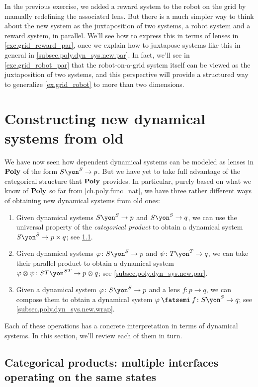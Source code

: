 \documentclass[Book-Poly]{subfiles}
\begin{document}
In the previous exercise, we added a reward system to the robot on the grid by manually redefining the associated lens.
But there is a much simpler way to think about the new system as the juxtaposition of two systems, a robot system and a reward system, in parallel.
We'll see how to express this in terms of lenses in \cref{exc.grid_reward_par}, once we explain how to juxtapose systems like this in general in \cref{subsec.poly.dyn_sys.new.par}.
In fact, we'll see in \cref{exc.grid_robot_par} that the robot-on-a-grid system itself can be viewed as the juxtaposition of two systems, and this perspective will provide a structured way to generalize \cref{ex.grid_robot} to more than two dimensions.


\section{Constructing new dynamical systems from old}\label{sec.poly.dyn_sys.new}

We have now seen how dependent dynamical systems can be modeled as lenses in $\mathbf{Poly}$ of the form $S\yon^S\to p$.
But we have yet to take full advantage of the categorical structure that $\mathbf{Poly}$ provides.
In particular, purely based on what we know of $\mathbf{Poly}$ so far from \cref{ch.poly.func_nat}, we have three rather different ways of obtaining new dynamical systems from old ones:
\begin{enumerate}
    \item Given dynamical systems $S\yon^S\to p$ and $S\yon^S\to q$, we can use the universal property of the \emph{categorical product} to obtain a dynamical system $S\yon^S\to p\times q$; see \cref{subsec.poly.dyn_sys.new.prod}.
    \item Given dynamical systems $\varphi\colon S\yon^S\to p$ and $\psi\colon T\yon^T\to q$, we can take their parallel product to obtain a dynamical system $\varphi\otimes\psi\colon ST\yon^{ST}\to p\otimes q$; see \cref{subsec.poly.dyn_sys.new.par}.
    \item Given a dynamical system $\varphi\colon S\yon^S\to p$ and a lens $f\colon p\to q$, we can compose them to obtain a dynamical system $\varphi\then f\colon S\yon^S\to q$; see \cref{subsec.poly.dyn_sys.new.wrap}.
\end{enumerate}
Each of these operations has a concrete interpretation in terms of dynamical systems.
In this section, we'll review each of them in turn.

\subsection{Categorical products: multiple interfaces operating on the same states}\label{subsec.poly.dyn_sys.new.prod}
\end{document}
